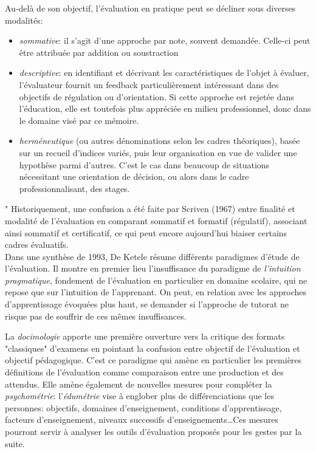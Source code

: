 \documentclass{article}
\begin{document}
Au-delà de son objectif, l'évaluation en pratique peut se décliner sous 
diverses modalités:
\begin{itemize}
    \item \emph{sommative}: il s'agit d'une approche par note, souvent 
    demandée. Celle-ci peut être attribuée par addition ou soustraction
    \item \emph{descriptive}: en identifiant et décrivant les 
    caractéristiques de l'objet à évaluer, l'évaluateur fournit un 
    feedback particulièrement intéressant dans des objectifs de 
    régulation ou d'orientation. Si cette approche est rejetée dans 
    l'éducation, elle est toutefois plus appréciée en milieu 
    professionnel, donc dans le domaine visé par ce mémoire.
    \item \emph{herméneutique} (ou autres dénominations selon les cadres 
    théoriques), basée sur un recueil d'indices variés, puis leur 
    organisation en vue de valider une hypothèse parmi d'autres. C'est le 
    cas dans beaucoup de situations nécessitant une orientation de 
    décision, ou alors dans le cadre professionnalisant, des stages.
\end{itemize}"
Historiquement, une confusion a été faite par Scriven (1967) entre 
finalité et modalité de l'évaluation en comparant sommatif et formatif 
(régulatif), associant ainsi sommatif et certificatif, ce qui peut encore 
aujourd'hui biaiser certains cadres évaluatifs.
\\

Dans une synthèse de 1993, De Ketele \cite{de_ketele_levaluation_1993}
résume différents paradigmes d'étude de l'évaluation. Il montre en
premier lieu l'insuffisance du paradigme de \emph{l'intuition 
pragmatique}, fondement de l'évaluation en particulier en domaine
scolaire, qui ne repose que sur l'intuition de l'apprenant. On peut, en
relation avec les approches d'apprentissage évoquées plus haut, se demander
si l'approche de tutorat ne risque pas de souffrir de ces mêmes
insuffisances.

La \emph{docimologie} apporte une première ouverture vers la critique des
formats "classiques" d'examens en pointant la confusion entre objectif de
l'évaluation et objectif pédagogique. C'est ce paradigme qui amène en 
particulier les premières définitions de l'évaluation comme comparaison 
entre une production et des attendus. Elle amène également de nouvelles
mesures pour compléter la \emph{psychométrie}: l'\emph{édumétrie} vise à
englober plus de différenciations que les personnes: objectifs, domaines
d'enseignement, conditions d'apprentissage, facteurs d'enseignement,
niveaux successifs d'enseignements\dots Ces mesures pourront servir à 
analyser les outils d'évaluation proposés pour les gestes par la suite.
\end{document}
